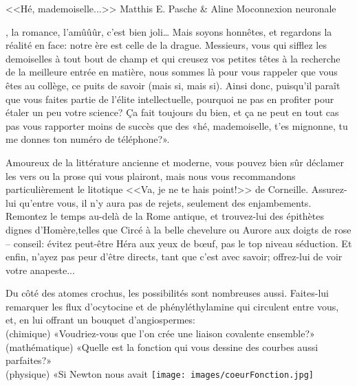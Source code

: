 \vspace*{-2mm}\ligne\vspace*{-4mm}\begin{article}
{<<Hé, mademoiselle...>>\saintValentin}
{Matthis E. Pasche \& Aline Mo}{connexion neuronale}

\begin{spacing}{.9}
, la romance, l'amûûûr, c'est bien joli… Mais soyons honnêtes, et regardons la réalité en face: notre ère est celle de la drague. Messieurs, vous qui sifflez les demoiselles à tout bout de champ et qui creusez vos petites têtes à la recherche de la meilleure entrée en matière, nous sommes là pour vous rappeler que vous êtes au collège, ce puits de savoir (mais si, mais si). Ainsi donc, puisqu'il paraît que vous faites partie de l'élite intellectuelle, pourquoi ne pas en profiter pour étaler un peu votre science? Ça fait toujours du bien, et ça ne peut en tout cas pas vous rapporter moins de succès que des «hé, mademoiselle, t'es mignonne, tu me donnes ton numéro de téléphone?».

Amoureux de la littérature ancienne et moderne, vous pouvez bien sûr déclamer les vers ou la prose qui vous plairont, mais nous vous recommandons particulièrement le litotique <<Va, je ne te hais point!>> de Corneille. Assurez-lui qu'entre vous, il n'y aura pas de rejets, seulement des enjambements. Remontez le temps au-delà de la Rome antique, et trouvez-lui des épithètes dignes d'Homère,\columnbreak telles que Circé à la belle chevelure ou Aurore aux doigts de rose -- conseil: évitez peut-être Héra aux yeux de bœuf, pas le top niveau séduction. Et enfin, n'ayez pas peur d'être directs, tant que c'est avec savoir; offrez-lui de voir votre anapeste...


Du côté des atomes crochus, les possibilités sont nombreuses aussi. Faites-lui remarquer les flux d'ocytocine et de phényléthylamine qui circulent entre vous, et, en lui offrant un bouquet d'angiospermes:\\
(chimique) «Voudriez-vous que l'on crée une liaison covalente ensemble?»\\
(mathématique) «Quelle est la fonction qui vous dessine des courbes aussi parfaites?»\\
(physique) «Si Newton nous avait
\texttt{[image: images/coeurFonction.jpg]}\columnbreak


\end{spacing}
\end{article}

